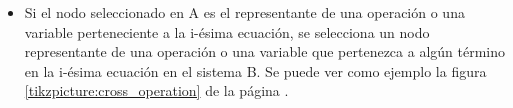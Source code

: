 \begin{itemize}
    \item Si el nodo seleccionado en A es el representante de una operación o una variable perteneciente a la i-ésima ecuación, se selecciona un nodo representante de una operación o una variable que pertenezca a algún término en la i-ésima ecuación en el sistema B. Se puede ver como ejemplo la figura \ref{tikzpicture:cross_operation} de la página \pageref{tikzpicture:cross_operation}.

          \begin{center}




\end{center}
\end{itemize}
